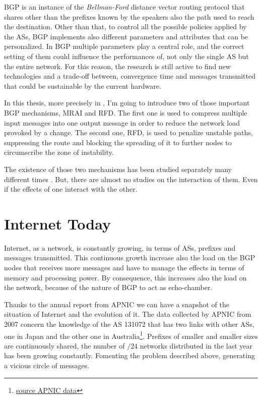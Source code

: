 \ac{BGP} is an instance of the \textit{Bellman-Ford} distance vector routing
protocol that shares other than the prefixes known by the speakers also the
path used to reach the destination.
Other than that, to control all the possible policies applied by the \acp{AS},
\ac{BGP} implements also different parameters and attributes that can be
personalized.
In \ac{BGP} multiple parameters play a central role, and the correct setting
of them could influence the performances of, not only the single \ac{AS} but
the entire network.
For this reason, the research is still active to find new technologies and
a trade-off between, convergence time and messages transmitted that could
be sustainable by the current hardware.

In this thesis, more precisely in , I'm going to introduce
two of those important \ac{BGP} mechanisms, \ac{MRAI} and \ac{RFD}.
The first one is used to compress multiple input messages into one
output message in order to reduce the network load provoked by a change.
The second one, \ac{RFD}, is used to penalize unstable paths, suppressing
the route and blocking the spreading of it to further nodes to circumscribe
the zone of instability.

The existence of those two mechanisms has been studied separately many different
times \cite{fabrikant2011there,daggitt2018rate,qiu2005optimal,gray2020bgp}.
But, there are almost no studies on the interaction of them.
Even if the effects of one interact with the other.

\section{Internet Today}
\label{sec:internet_today}

Internet, as a network, is constantly growing, in terms of \acp{AS}, prefixes
and messages transmitted.
This continuous growth increase also the load on the \ac{BGP} nodes that
receives more messages and have to manage the effects in terms of memory
and processing power.
By consequence, this increases also the load on the network, because of the
nature of \ac{BGP} to act as echo-chamber.

Thanks to the annual report from \ac{APNIC} we can have a snapshot of
the situation of Internet and the evolution of it.
The data collected by \ac{APNIC} from \num{2007} concern the knowledge
of the \ac{AS} 131072 that has two links with other \acp{AS}, one in Japan and
the other one in Australia\footnote{\href{https://blog.apnic.net/2021/01/05/bgp-in-2020-the-bgp-table/}{source APNIC data}}.
Prefixes of smaller and smaller sizes are continuously shared, the number of
$/24$ networks distributed in the last year has been growing constantly.
Fomenting the problem described above, generating a vicious circle of messages.

